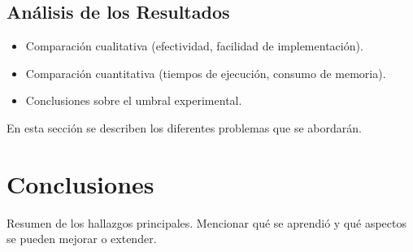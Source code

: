 \documentclass[a4paper,12pt]{article}
\begin{document}
\subsection{Análisis de los Resultados}
\begin{itemize}
	\item Comparación cualitativa (efectividad, facilidad de implementación).
	\item Comparación cuantitativa (tiempos de ejecución, consumo de memoria).
	\item Conclusiones sobre el umbral experimental.
\end{itemize}

En esta sección se describen los diferentes problemas que se abordarán.

\section{Conclusiones}
Resumen de los hallazgos principales. Mencionar qué se aprendió
y qué aspectos se pueden mejorar o extender.
\end{document}
